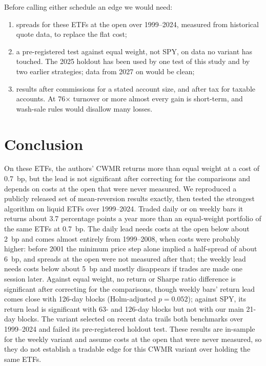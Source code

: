\documentclass[11pt]{article}
\begin{document}
Before calling either schedule an edge we would need:
\begin{enumerate}
  \item spreads for these ETFs at the open over 1999--2024, measured from historical quote
        data, to replace the flat cost;
  \item a pre-registered test against equal weight, not SPY, on data no variant has touched. The
        2025 holdout has been used by one test of this study and by two earlier strategies; data
        from 2027 on would be clean;
  \item results after commissions for a stated account size, and after tax for taxable
        accounts. At 76$\times$ turnover or more almost every gain is short-term, and wash-sale
        rules would disallow many losses.
\end{enumerate}

\section{Conclusion}

On these ETFs, the authors' CWMR returns more than equal weight at a cost of 0.7~bp, but the lead
is not significant after correcting for the comparisons and depends on costs at the open that
were never measured. We reproduced a publicly released set of mean-reversion results exactly,
then tested the strongest algorithm on liquid ETFs over 1999--2024. Traded daily or on weekly bars it returns
about 3.7 percentage points a year more than an equal-weight portfolio of the same ETFs at
0.7~bp. The daily lead needs costs at the open below about 2~bp and comes almost entirely from
1999--2008, when costs were probably higher: before 2001 the minimum price step alone implied a
half-spread of about 6~bp, and spreads at the open were not measured after that; the weekly lead needs costs below about 5~bp and mostly
disappears if trades are made one session later. Against equal weight, no return or Sharpe
ratio difference is significant after correcting for the comparisons, though weekly bars' return
lead comes close with 126-day blocks (Holm-adjusted $p = 0.052$); against SPY, its return lead
is significant with 63- and 126-day blocks but not with our main 21-day blocks. The variant selected on recent data trails both benchmarks over 1999--2024 and
failed its pre-registered holdout test. These results are in-sample for the weekly variant and
assume costs at the open that were never measured, so they do not establish a tradable edge
for this CWMR variant over holding the same ETFs.
\end{document}
